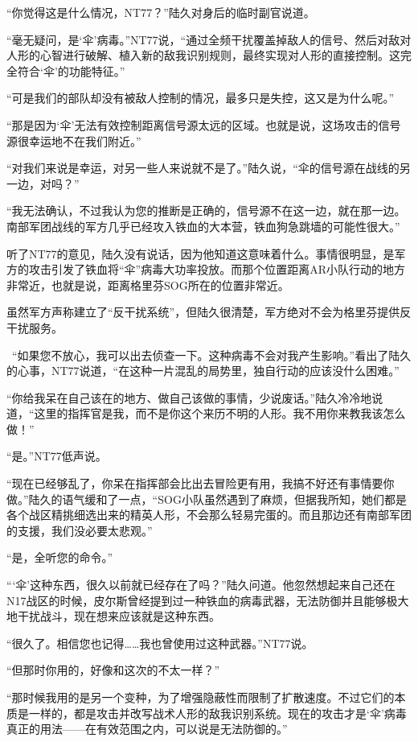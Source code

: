 “你觉得这是什么情况，NT77？”陆久对身后的临时副官说道。

“毫无疑问，是‘伞’病毒。”NT77说，“通过全频干扰覆盖掉敌人的信号、然后对敌对人形的心智进行破解、植入新的敌我识别规则，最终实现对人形的直接控制。这完全符合‘伞’的功能特征。”

“可是我们的部队却没有被敌人控制的情况，最多只是失控，这又是为什么呢。”

“那是因为‘伞’无法有效控制距离信号源太远的区域。也就是说，这场攻击的信号源很幸运地不在我们附近。”

“对我们来说是幸运，对另一些人来说就不是了。”陆久说，“伞的信号源在战线的另一边，对吗？”

“我无法确认，不过我认为您的推断是正确的，信号源不在这一边，就在那一边。南部军团战线的军方几乎已经攻入铁血的大本营，铁血狗急跳墙的可能性很大。”

听了NT77的意见，陆久没有说话，因为他知道这意味着什么。事情很明显，是军方的攻击引发了铁血将“伞”病毒大功率投放。而那个位置距离AR小队行动的地方非常近，也就是说，距离格里芬SOG所在的位置非常近。

虽然军方声称建立了“反干扰系统”，但陆久很清楚，军方绝对不会为格里芬提供反干扰服务。

 “如果您不放心，我可以出去侦查一下。这种病毒不会对我产生影响。”看出了陆久的心事，NT77说道，“在这种一片混乱的局势里，独自行动的应该没什么困难。”

“你给我呆在自己该在的地方、做自己该做的事情，少说废话。”陆久冷冷地说道，“这里的指挥官是我，而不是你这个来历不明的人形。我不用你来教我该怎么做！”

“是。”NT77低声说。

“现在已经够乱了，你呆在指挥部会比出去冒险更有用，我搞不好还有事情要你做。”陆久的语气缓和了一点，“SOG小队虽然遇到了麻烦，但据我所知，她们都是各个战区精挑细选出来的精英人形，不会那么轻易完蛋的。而且那边还有南部军团的支援，我们没必要太悲观。”

“是，全听您的命令。”

“‘伞’这种东西，很久以前就已经存在了吗？”陆久问道。他忽然想起来自己还在N17战区的时候，皮尔斯曾经提到过一种铁血的病毒武器，无法防御并且能够极大地干扰战斗，现在想来应该就是这种东西。

“很久了。相信您也记得……我也曾使用过这种武器。”NT77说。

“但那时你用的，好像和这次的不太一样？”

“那时候我用的是另一个变种，为了增强隐蔽性而限制了扩散速度。不过它们的本质是一样的，都是攻击并改写战术人形的敌我识别系统。现在的攻击才是‘伞’病毒真正的用法——在有效范围之内，可以说是无法防御的。”

